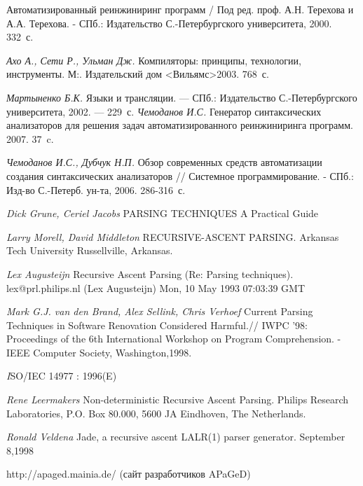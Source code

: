 \begin{thebibliography}{50}

         Автоматизированный реинжиниринг программ / Под ред. проф. А.Н. Терехова и А.А. Терехова. - СПб.: Издательство С.-Петербургского университета, 2000. 332~с.

         \emph {Ахо А., Сети Р., Ульман Дж.} Компиляторы: принципы, технологии, инструменты.  М:. Издательский дом <Вильямс>2003. 768~с.

         \emph {Мартыненко Б.К.} Языки и трансляции. — СПб.: Издательство С.-Петербургского университета, 2002. — 229~с.
         \emph{Чемоданов И.С.} Генератор синтаксических анализаторов  для решения задач автоматизированного реинжиниринга программ. 2007. 37~c.        

         \emph{Чемоданов И.С., Дубчук Н.П.} Обзор современных средств автоматизации создания синтаксических анализаторов // Системное программирование. - СПб.: Изд-во С.-Петерб. ун-та, 2006. 286-316~с.


         \emph{Dick Grune, Ceriel Jacobs} PARSING TECHNIQUES A Practical Guide

         \emph {Larry Morell, David Middleton} RECURSIVE-ASCENT PARSING. Arkansas Tech University Russellville, Arkansas. 

         \emph {Lex Augusteijn} Recursive Ascent Parsing (Re: Parsing techniques). lex@prl.philips.nl (Lex Augusteijn) Mon, 10 May 1993 07:03:39 GMT 


         \emph{Mark G.J. van den Brand, Alex Sellink, Chris Verhoef} 
                Current Parsing Techniques in Software Renovation Considered Harmful.// IWPC '98: Proceedings of the 6th International Workshop on Program Comprehension. - IEEE Computer Society, Washington,1998.
        
         \emph ISO/IEC 14977 : 1996(E)

         \emph {Rene Leermakers} Non-deterministic Recursive Ascent Parsing. Philips Research Laboratories, P.O. Box 80.000, 5600 JA Eindhoven, The Netherlands. 


         \emph {Ronald Veldena} Jade, a recursive ascent LALR(1) parser generator. September 8,1998




         http://apaged.mainia.de/ (сайт разработчиков APaGeD)


\end{thebibliography}

